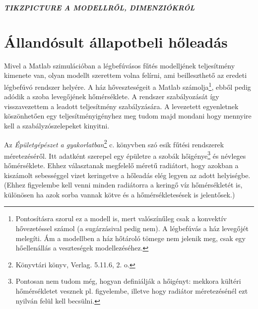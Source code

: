 \textbf{\textit{TIKZPICTURE A MODELLRŐL, DIMENZIÓKRÓL}}



\section{Állandósult állapotbeli hőleadás}



\begin{formal}
Mivel a Matlab szimulációban a légbefúvásos fűtés modelljének teljesítmény kimenete van, olyan modellt szerettem volna felírni, ami beilleszthető az eredeti légbefúvó rendszer helyére. A ház hőveszteségeit a Matlab számolja\footnote{Pontosításra szorul ez a modell is, mert valószínűleg csak a konvektív hővezetéssel számol (a sugárzásival pedig nem). A légbefúvás a ház levegőjét melegíti. Ám a modellben a ház hőtároló tömege nem jelenik meg, csak egy hőellenállás a veszteségek modellezéséhez.}, ebből pedig adódik a szoba levegőjének hőmérséklete. A rendszer szabályozását így visszavezettem a leadott teljesítmény szabályzására. A levezetett egyenletnek köszönhetően egy teljesítményigényhez meg tudom majd mondani hogy mennyire kell a szabályzószelepeket kinyitni.


Az \textit{Épületgépészet a gyakorlatban}\footnote{Könyvtári könyv, Verlag. 5.11.6, 2. o.} c. könyvben szó esik fűtési rendszerek méretezéséről. Itt adatként szerepel egy épületre a szobák hőigénye\footnote{Pontosan nem tudom még, hogyan definiálják a hőigényt: mekkora kültéri hőmérsékletet vesznek pl. figyelembe, illetve hogy radiátor méretezésénél ezt nyilván felül kell becsülni.} és névleges hőmérséklete. Ehhez választanak megfelelő méretű radiátort, hogy azokban a kiszámolt sebességgel vizet keringetve a hőleadás elég legyen az adott helyiségbe.
{\scriptsize(Ehhez figyelembe kell venni minden radiátorra a keringő víz hőmérsékletét is, különösen ha azok sorba vannak kötve és a hőmérsékletesések is jelentősek.)}



\end{formal}
